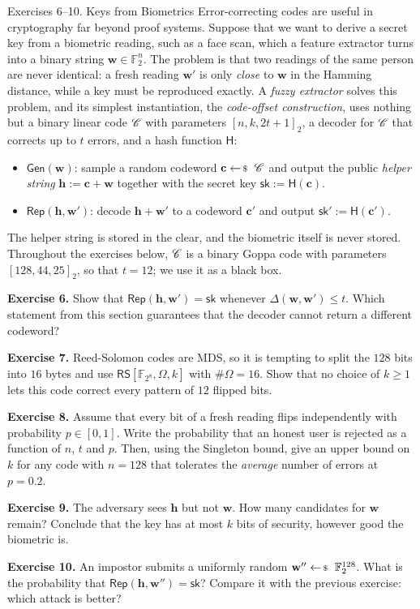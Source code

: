 \documentclass[../../book]{subfiles}
\begin{document}
\begin{exbox}{Exercises 6--10. Keys from Biometrics}
Error-correcting codes are useful in cryptography far beyond proof systems.
Suppose that we want to derive a secret key from a biometric reading, such as a face scan, which a feature extractor turns into a binary string $\mathbf{w} \in \mathbb{F}_2^n$.
The problem is that two readings of the same person are never identical: a fresh reading $\mathbf{w}'$ is only \emph{close} to $\mathbf{w}$ in the Hamming distance, while a key must be reproduced exactly.
A \emph{fuzzy extractor} solves this problem, and its simplest instantiation, the \emph{code-offset construction}, uses nothing but a binary linear code $\mathscr{C}$ with parameters $[n, k, 2t+1]_2$, a decoder for $\mathscr{C}$ that corrects up to $t$ errors, and a hash function $\mathsf{H}$:
\begin{itemize}
    \item $\mathsf{Gen}(\mathbf{w})$: sample a random codeword $\mathbf{c} \leftarrowS \code$ and output the public \emph{helper string} $\mathbf{h} := \mathbf{c} + \mathbf{w}$ together with the secret key $\mathsf{sk} := \mathsf{H}(\mathbf{c})$.
    \item $\mathsf{Rep}(\mathbf{h}, \mathbf{w}')$: decode $\mathbf{h} + \mathbf{w}'$ to a codeword $\mathbf{c}'$ and output $\mathsf{sk}' := \mathsf{H}(\mathbf{c}')$.
\end{itemize}
The helper string is stored in the clear, and the biometric itself is never stored.
Throughout the exercises below, $\mathscr{C}$ is a binary Goppa code with parameters $[128, 44, 25]_2$, so that $t = 12$; we use it as a black box.
\end{exbox}

\textbf{Exercise 6.}
Show that $\mathsf{Rep}(\mathbf{h}, \mathbf{w}') = \mathsf{sk}$ whenever $\Delta(\mathbf{w}, \mathbf{w}') \leq t$.
Which statement from this section guarantees that the decoder cannot return a different codeword?

\textbf{Exercise 7.} Reed-Solomon codes are MDS, so it is tempting to split the $128$ bits into $16$ bytes and use $\mathsf{RS}[\mathbb{F}_{2^8}, \Omega, k]$ with $\#\Omega = 16$.
Show that no choice of $k \geq 1$ lets this code correct every pattern of $12$ flipped bits.

\textbf{Exercise 8.} Assume that every bit of a fresh reading flips independently with probability $p \in [0,1]$.
Write the probability that an honest user is rejected as a function of $n$, $t$ and $p$.
Then, using the Singleton bound, give an upper bound on $k$ for any code with $n = 128$ that tolerates the \emph{average} number of errors at $p = 0.2$.

\textbf{Exercise 9.} The adversary sees $\mathbf{h}$ but not $\mathbf{w}$.
How many candidates for $\mathbf{w}$ remain?
Conclude that the key has at most $k$ bits of security, however good the biometric is.

\textbf{Exercise 10.} An impostor submits a uniformly random $\mathbf{w}'' \leftarrowS \mathbb{F}_2^{128}$.
What is the probability that $\mathsf{Rep}(\mathbf{h}, \mathbf{w}'') = \mathsf{sk}$?
Compare it with the previous exercise: which attack is better?
\end{document}
